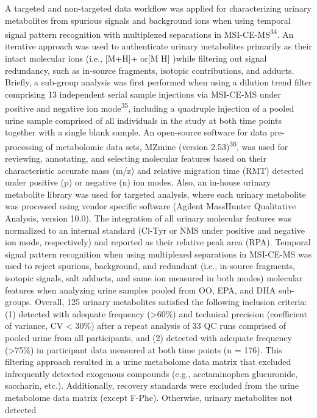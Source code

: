 \documentclass[journal=jacsat,manuscript=article]{achemso}
\begin{document}
A targeted and non-targeted data workflow was applied for characterizing
urinary metabolites from spurious signals and background ions when using
temporal signal pattern recognition with multiplexed separations in
MSI-CE-MS\textsuperscript{34}. An iterative approach was used to
authenticate urinary metabolites primarily as their intact molecular
ions (i.e., {[}M+H{]}+ or{[}M H{]} )while filtering out signal
redundancy, such as in-source fragments, isotopic contributions, and
adducts. Briefly, a sub-group analysis was first performed when using a
dilution trend filter comprising 13 independent serial sample injections
via MSI-CE-MS under positive and negative ion mode\textsuperscript{35},
including a quadruple injection of a pooled urine sample comprised of
all individuals in the study at both time points together with a single
blank sample. An open-source software for data pre-processing of
metabolomic data sets, MZmine (version 2.53)\textsuperscript{36}, was
used for reviewing, annotating, and selecting molecular features based
on their characteristic accurate mass (m/z) and relative migration time
(RMT) detected under positive (p) or negative (n) ion modes. Also, an
in-house urinary metabolite library was used for targeted analysis,
where each urinary metabolite was processed using vendor specific
software (Agilent MassHunter Qualitative Analysis, version 10.0). The
integration of all urinary molecular features was normalized to an
internal standard (Cl-Tyr or NMS under positive and negative ion mode,
respectively) and reported as their relative peak area (RPA). Temporal
signal pattern recognition when using multiplexed separations in
MSI-CE-MS was used to reject spurious, background, and redundant (i.e.,
in-source fragments, isotopic signals, salt adducts, and same ion
measured in both modes) molecular features when analyzing urine samples
pooled from OO, EPA, and DHA sub-groups. Overall, 125 urinary
metabolites satisfied the following inclusion criteria: (1) detected
with adequate frequency (\textgreater60\%) and technical precision
(coefficient of variance, CV \textless{} 30\%) after a repeat analysis
of 33 QC runs comprised of pooled urine from all participants, and (2)
detected with adequate frequency (\textgreater75\%) in participant data
measured at both time points (n = 176). This filtering approach resulted
in a urine metabolome data matrix that excluded infrequently detected
exogenous compounds (e.g., acetaminophen glucuronide, saccharin, etc.).
Additionally, recovery standards were excluded from the urine metabolome
data matrix (except F-Phe). Otherwise, urinary metabolites not detected
\end{document}

